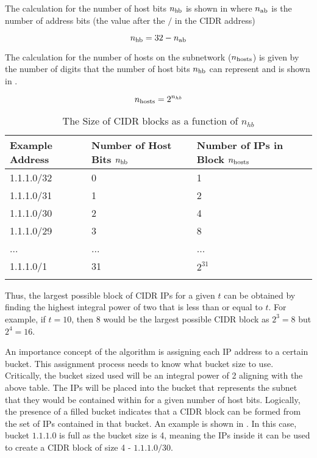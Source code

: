 The calculation for the number of host bits $n_\text{hb}$ is shown in  where $n_\text{ab}$ is the number of address bits (the value after the $/$ in the CIDR address)

\begin{equation}\label{eq:numHostBits}
n_\text{hb} = 32 - n_\text{ab} 
\end{equation} 

The calculation for the number of hosts on the subnetwork ($n_\text{hosts}$) is given by the number of digits that the number of host bits $n_\text{hb}$ can represent and is shown in .

\begin{equation}\label{eq:numHosts}
n_\text{hosts} = 2 ^ {n_{hb}}
\end{equation}

\begin{table}[H]
\caption{The Size of CIDR blocks as a function of $n_{hb}$}
\label{tbl:cidrBlockSize}
\centering
\begin{tabular}{l l l}
\toprule
\textbf{Example Address} & \textbf{Number of Host Bits $n_\text{hb}$} &\textbf{Number of IPs in Block $n_\text{hosts}$} \\
\midrule
1.1.1.0/32 & 0 & 1\\
1.1.1.0/31 & 1 & 2\\
1.1.1.0/30 & 2 & 4\\
1.1.1.0/29 & 3 & 8\\
... & ... & ...\\
1.1.1.0/1 & 31 & $2 ^ {31}$\\
\bottomrule\\
\end{tabular}
\end{table}

Thus, the largest possible block of CIDR IPs for a given $t$ can be obtained by finding the highest integral power of two that is less than or equal to $t$. For example, if $t = 10$, then 8 would be the largest possible CIDR block as $2^3 = 8$ but $2^4 = 16$.

An importance concept of the algorithm is assigning each IP address to a certain bucket. This assignment process needs to know what bucket size to use. Critically, the bucket sized used will be an integral power of 2 aligning with the above table. The IPs will be placed into the bucket that represents the subnet that they would be contained within for a given number of host bits. Logically, the presence of a filled bucket indicates that a CIDR block can be formed from the set of IPs contained in that bucket. An example is shown in . In this case, bucket $1.1.1.0$ is full as the bucket size is 4, meaning the IPs inside it can be used to create a CIDR block of size 4 - $1.1.1.0/30$.

